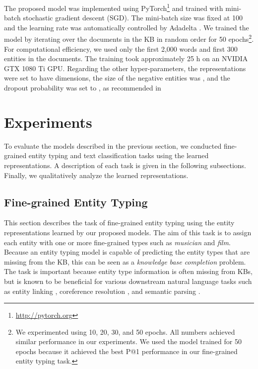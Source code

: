 \documentclass[11pt]{article}
\begin{document}
  The proposed model was implemented using PyTorch\footnote{\url{http://pytorch.org}} and trained with mini-batch stochastic gradient descent (SGD).
  The mini-batch size was fixed at 100 and the learning rate was automatically controlled by Adadelta \cite{Zeiler2012}.
  We trained the model by iterating over the documents in the KB in random order for 50 epochs\footnote{We experimented using 10, 20, 30, and 50 epochs. All numbers achieved similar performance in our experiments. We used the model trained for 50 epochs because it achieved the best P@1 performance in our fine-grained entity typing task.}.
  For computational efficiency, we used only the first 2,000 words and first 300 entities in the documents.
  The training took approximately 25 h on an NVIDIA GTX 1080 Ti GPU.
  Regarding the other hyper-parameters, the representations were set to have  dimensions, the size of the negative entities was , and the dropout probability was set to , as recommended in 

  \section{Experiments}

  To evaluate the models described in the previous section, we conducted fine-grained entity typing and text classification tasks using the learned representations.
  A description of each task is given in the following subsections.
  Finally, we qualitatively analyze the learned representations.

  \subsection{Fine-grained Entity Typing}
  \label{subsec:entity-typing}

  This section describes the task of fine-grained entity typing \cite{yaghoobzadeh-schutze:2015:EMNLP,neelakantan-chang:2015:NAACL-HLT,yaghoobzadeh-schutze:2017:EACLlong} using the entity representations learned by our proposed models.
  The aim of this task is to assign each entity with one or more fine-grained types such as \textit{musician} and \textit{film}.
  Because an entity typing model is capable of predicting the entity types that are missing from the KB, this can be seen as a \textit{knowledge base completion} problem.
  The task is important because entity type information is often missing from KBs, but is known to be beneficial for various downstream natural language tasks such as entity linking \cite{Ling2015}, coreference resolution \cite{hajishirzi-EtAl:2013:EMNLP}, and semantic parsing \cite{Liu:2015:TWE:2886521.2886657}.
\end{document}
